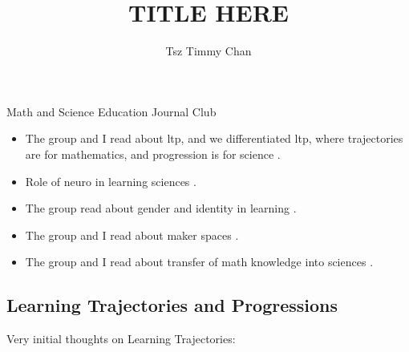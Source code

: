 \documentclass{TC}
\title{TITLE HERE}	%
\author{Tsz Timmy Chan}	%
\begin{document}
Math and Science Education Journal Club
\begin{itemize}
\item The group and I read about \gls{ltp}, and we differentiated \gls{ltp}, where trajectories are for mathematics, and progression is for science
 \parencite{duncan_learning_2018, schwarz_developing_2009, lobato_taxonomy_2017}. 
\item Role of neuro in learning sciences \parencite{jacobson_conceptualizing_2016}.
\item The group read about gender and identity in learning \parencite{darragh_identity_2016, liben_developmental_2014}.
\item The group and I read about maker spaces \parencite{halverson_maker_2018, blikstein_assessment_2017}.
\item The group and I read about transfer of math knowledge into sciences \parencite{britton_case_2005, roberts_index_2007, tariq_defining_2008}.

\end{itemize}
\subsection{Learning Trajectories and Progressions}
Very initial thoughts on Learning Trajectories: 


\end{document}
